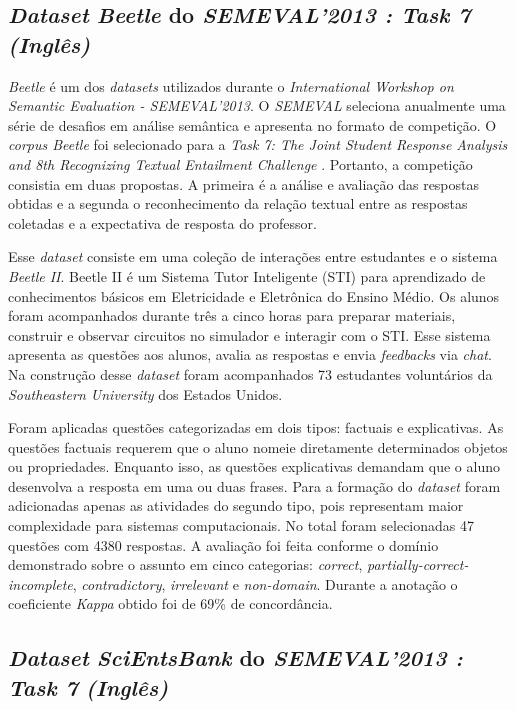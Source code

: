 \subsection{\textit{Dataset} \textit{Beetle} do \textit{SEMEVAL'2013 : Task 7} \textit{(Inglês)}}
\label{beetle-db}

\textit{Beetle} \cite{dzikovska2012} é um dos \textit{datasets} utilizados durante o \textit{International Workshop on Semantic Evaluation - SEMEVAL'2013}. O \textit{SEMEVAL} seleciona anualmente uma série de desafios em análise semântica e apresenta no formato de competição. O \textit{corpus Beetle} foi selecionado para a \textit{Task 7: The Joint Student Response Analysis and 8th Recognizing Textual Entailment Challenge} \cite{dzikovska2013}. Portanto, a competição consistia em duas propostas. A primeira é a análise e avaliação das respostas obtidas e a segunda o reconhecimento da relação textual entre as respostas coletadas e a expectativa de resposta do professor.

Esse \textit{dataset} consiste em uma coleção de interações entre estudantes e o sistema \textit{Beetle II}. Beetle II é um Sistema Tutor Inteligente (STI) para aprendizado de conhecimentos básicos em Eletricidade e Eletrônica do Ensino Médio. Os alunos foram acompanhados durante três a cinco horas para preparar materiais, construir e observar circuitos no simulador e interagir com o STI. Esse sistema apresenta as questões aos alunos, avalia as respostas e envia \textit{feedbacks} via \textit{chat}. Na construção desse \textit{dataset} foram acompanhados 73 estudantes voluntários da \textit{Southeastern University} dos Estados Unidos.

Foram aplicadas questões categorizadas em dois tipos: factuais e explicativas. As questões factuais requerem que o aluno nomeie diretamente determinados objetos ou propriedades. Enquanto isso, as questões explicativas demandam que o aluno desenvolva a resposta em uma ou duas frases. Para a formação do \textit{dataset} foram adicionadas apenas as atividades do segundo tipo, pois representam maior complexidade para sistemas computacionais. No total foram selecionadas 47 questões com 4380 respostas. A avaliação foi feita conforme o domínio demonstrado sobre o assunto em cinco categorias: \textit{correct}, \textit{partially-correct-incomplete}, \textit{contradictory}, \textit{irrelevant} e \textit{non-domain}. Durante a anotação o coeficiente \textit{Kappa} obtido foi de 69\% de concordância.


\subsection{\textit{Dataset} \textit{SciEntsBank} do \textit{SEMEVAL'2013 : Task 7} \textit{(Inglês)}}
\label{scientsbank-db}

